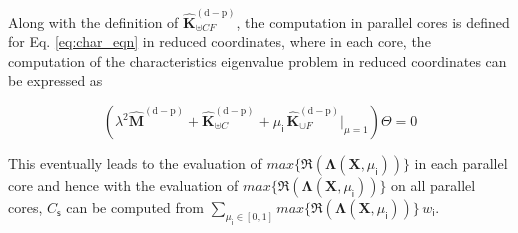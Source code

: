 Along with the definition of $\mathbf{\hat{K}}^{\mathrm{(d-p)}}_{\uplus CF}$, the computation in parallel cores is defined for Eq. \eqref{eq:char_eqn} in reduced coordinates, where in each core, the computation of the characteristics eigenvalue problem in reduced coordinates can be expressed as

\begin{equation}
 (\lambda^{2} \mathbf{\hat M}^{\mathrm{(d-p)}}+\mathbf{\hat{K}}^{\mathrm{(d-p)}}_{\uplus C}+\mu_{\mathsf i}\, \mathbf{\hat{K}}^{\mathrm{(d-p)}}_{\cup F}|_{\mu=1}) \Theta =0
\end{equation} 

This eventually leads to the evaluation of $max\{\Re(\bm \Lambda(\bm X,{\mu}_{\mathsf i}))\}$ in each parallel core and hence with the evaluation of  $max\{\Re(\bm \Lambda(\bm X,{\mu}_{\mathsf i}))\}$ on all parallel cores, $C_{\mathsf s}$ can be computed from $\sum_{{\mu}_{\mathsf i}\in [0,1]}max\{\Re(\bm \Lambda(\bm X,{\mu}_{\mathsf i}))\}\,w_{{\mathsf i}}$.

